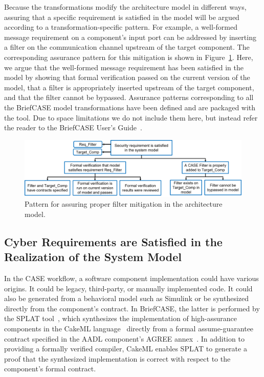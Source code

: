 Because the transformations modify the architecture model in different ways, assuring that a specific requirement is satisfied in the model will be argued according to a transformation-specific pattern.  For example, a well-formed message requirement on a component's input port can be addressed by inserting a filter on the communication channel upstream of the target component.  The corresponding assurance pattern for this mitigation is shown in Figure~\ref{fig:filter}.  Here, we argue that the well-formed message requirement has been satisfied in the model by showing that formal verification passed on the current version of the model, that a filter is appropriately inserted upstream of the target component, and that the filter cannot be bypassed.  Assurance patterns corresponding to all the BriefCASE model transformations have been defined and are packaged with the tool.  Due to space limitations we do not include them here, but instead refer the reader to the BriefCASE User's Guide~\cite{BriefCASE-user-guide}.

\begin{figure}[h] 
	\centering 
	\includegraphics[width=\textwidth]{figs/filter.png}
	\caption{Pattern for assuring proper filter mitigation in the architecture model.}
	\label{fig:filter} 
\end{figure}

\subsection{Cyber Requirements are Satisfied in the Realization of the System Model}

In the CASE workflow, a software component implementation could have various origins.  It could be legacy, third-party, or manually implemented code. It could also be generated from a behavioral model such as Simulink or be synthesized directly from the component's contract.  In BriefCASE, the latter is performed by the SPLAT tool~\cite{case-verified-filter}, which synthesizes the implementation of high-assurance components in the CakeML language~\cite{cakeml} directly from a formal assume-guarantee contract specified in the AADL component's AGREE annex~\cite{compositional-analysis-agree}.  In addition to providing a formally verified compiler, CakeML enables SPLAT to generate a proof that the synthesized implementation is correct with respect to the component's formal contract.

